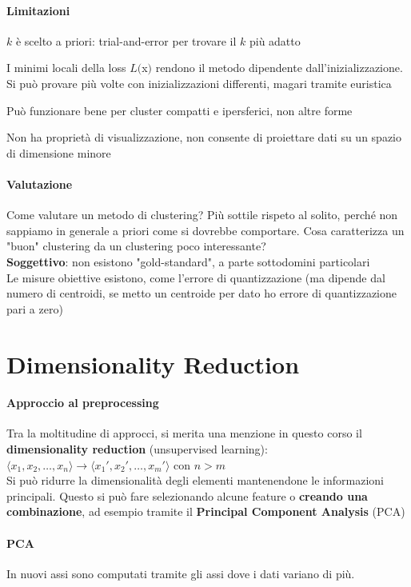 \documentclass[10pt]{book}
\begin{document}
\paragraph{Limitazioni} \begin{list}{}{}
	\item $k$ è scelto a priori: trial-and-error per trovare il $k$ più adatto
	\item I minimi locali della loss $L($x$)$ rendono il metodo dipendente dall'inizializzazione.\\
	Si può provare più volte con inizializzazioni differenti, magari tramite euristica
	\item Può funzionare bene per cluster compatti e ipersferici, non altre forme
	\item Non ha proprietà di visualizzazione, non consente di proiettare dati su un spazio di dimensione minore
\end{list}
\paragraph{Valutazione} Come valutare un metodo di clustering? Più sottile rispeto al solito, perché non sappiamo in generale a priori come si dovrebbe comportare. Cosa caratterizza un "buon" clustering da un clustering poco interessante?\\
\textbf{Soggettivo}: non esistono "gold-standard", a parte sottodomini particolari\\
Le misure obiettive esistono, come l'errore di quantizzazione (ma dipende dal numero di centroidi, se metto un centroide per dato ho errore di quantizzazione pari a zero)
\section{Dimensionality Reduction}
\paragraph{Approccio al preprocessing} Tra la moltitudine di approcci, si merita una menzione in questo corso il \textbf{dimensionality reduction} (unsupervised learning):
$\langle x_1, x_2,\ldots,x_n\rangle \rightarrow \langle x_1', x_2', \ldots, x_m'\rangle$ con $n > m$\\
Si può ridurre la dimensionalità degli elementi mantenendone le informazioni principali. Questo si può fare selezionando alcune feature o \textbf{creando una combinazione}, ad esempio tramite il \textbf{Principal Component Analysis} (PCA)
\paragraph{PCA} In nuovi assi sono computati tramite gli assi dove i dati variano di più.
\end{document}

